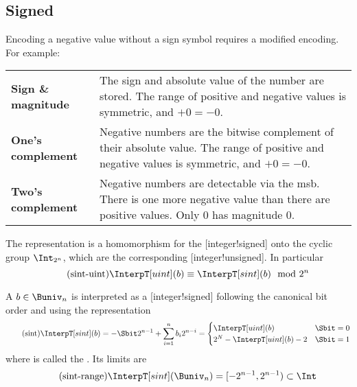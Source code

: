 \subsection{Signed}

Encoding a negative value without a sign symbol requires a modified encoding.
For example:

\begin{tabularx}{\textwidth}{>{\bfseries}lX}
    Sign \& magnitude &

    The sign and absolute value of the number are stored.
    The range of positive and negative values is symmetric, and \(+0=-0\).\\

    One's complement &

    Negative numbers are the bitwise complement of their absolute value.
    The range of positive and negative values is symmetric, and \(+0=-0\).\\

    Two's complement &

    Negative numbers are detectable via the \gls{msb}.
    There is one more negative value than there are positive values.
    Only \(0\) has magnitude \(0\).
\end{tabularx}

The  representation is a homomorphism for the [integer!signed] onto the cyclic group \(\Int_{2^n}\), which are the corresponding [integer!unsigned].
In particular
\begin{equation*}
    \label{eq:sint_uint}
    \tag{sint-uint}
    \InterpT[uint](b) \equiv \InterpT[sint](b) \mod 2^n
\end{equation*}

\begin{definition}
    A  \(b \in \Buniv_n\) is interpreted as a [integer!signed] following the canonical bit order and using the  representation
    \begin{equation}
        \label{eq:sint}
        \tag{sint}
        \InterpT[sint](b) = -\Sbit 2^{n-1} + \sum_{i=1}^{n} b_i 2^{n-i} = \begin{cases}
            \InterpT[uint](b) & \Sbit = 0 \\
            2^N - \InterpT[uint](b) - 2 & \Sbit = 1
        \end{cases}
    \end{equation}
    where \Sbit{} is called the .
    Its limits are
    \begin{equation}
        \label{eq:sint_range}
        \tag{sint-range}
        \InterpT[sint](\Buniv_n) = [-2^{n-1}, 2^{n-1}) \subset \Int
    \end{equation}
\end{definition}

